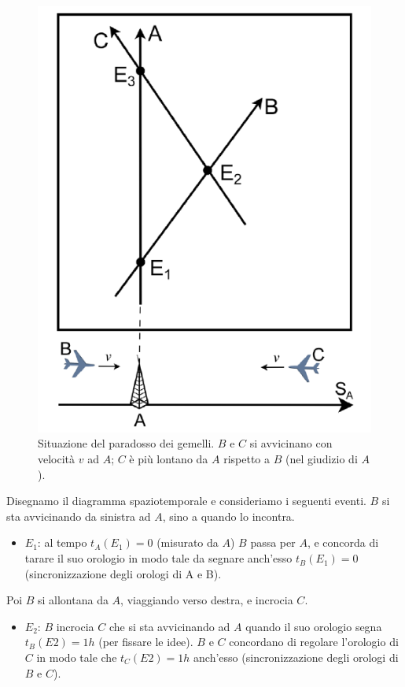 \begin{figure}[htbp]
   \centering
   \includegraphics[scale=1]{immagini/conferme_relspec/gemelli2}
   \caption{\label{gemelli2}Situazione del paradosso dei gemelli. $B$ e $C$ si avvicinano con
velocità $v$ ad $A$; $C$ è più lontano da $A$ rispetto a $B$ (nel giudizio di $A$).}
\end{figure}

Disegnamo il diagramma spaziotemporale  e consideriamo i seguenti eventi. 
$B$ si sta avvicinando da sinistra ad $A$, sino a quando lo
incontra.
\begin{itemize}
 \item $E_1$: al tempo $t_A(E_1) = 0$ (misurato da $A$) $B$ passa per $A$, e concorda
di tarare il suo orologio in modo tale da segnare anch'esso $t_B(E_1) = 0$ (sincronizzazione degli orologi di A e B).
\end{itemize}

Poi $B$ si allontana da $A$, viaggiando verso destra, e incrocia $C$.
\begin{itemize}
\item $E_2$: $B$ incrocia $C$ che si sta avvicinando ad $A$ quando il suo orologio
segna $t_B (E2) = 1 h$ (per fissare le idee). $B$ e $C$ concordano di regolare
l'orologio di $C$ in modo tale che $t_C (E2) = 1 h$ anch'esso (sincronizzazione
degli orologi di $B$ e $C$).
\end{itemize}

